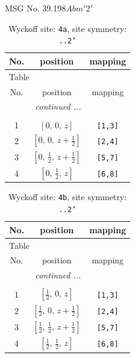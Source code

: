\documentclass[fleqn,8pt]{jsarticle}
\begin{document}
\setcounter{MaxMatrixCols}{32}

\renewcommand{\tablename}{Table~}
\renewcommand{\figurename}{Figure~}
\begin{center}
\LARGE
MSG No. 39.198\quad$Abm'2'$
\end{center}
\renewcommand{\arraystretch}{1.2}
\begin{longtable}{ccc}
\caption{Wyckoff site: {\tt 4a}, site symmetry: {\tt ..2'}}
 \\
 \hline \hline
No. & position & mapping \\ \hline \endfirsthead

\multicolumn{2}{l}{\tablename\ \thetable{}} \\
 \hline \hline
No. & position & mapping \\ \hline \endhead

 \hline \hline
\multicolumn{2}{r}{\footnotesize\it continued ...} \\ \endfoot

 \hline \hline
\multicolumn{2}{r}{} \\ \endlastfoot

1 & $\left[ 0,\, 0,\, z \right]$ & {\tt [1,3]} \\ \hline
2 & $\left[ 0,\, 0,\, z + \frac{1}{2} \right]$ & {\tt [2,4]} \\ \hline
3 & $\left[ 0,\, \frac{1}{2},\, z + \frac{1}{2} \right]$ & {\tt [5,7]} \\ \hline
4 & $\left[ 0,\, \frac{1}{2},\, z \right]$ & {\tt [6,8]} \\
\end{longtable}
\renewcommand{\arraystretch}{1.2}
\begin{longtable}{ccc}
\caption{Wyckoff site: {\tt 4b}, site symmetry: {\tt ..2'}}
 \\
 \hline \hline
No. & position & mapping \\ \hline \endfirsthead

\multicolumn{2}{l}{\tablename\ \thetable{}} \\
 \hline \hline
No. & position & mapping \\ \hline \endhead

 \hline \hline
\multicolumn{2}{r}{\footnotesize\it continued ...} \\ \endfoot

 \hline \hline
\multicolumn{2}{r}{} \\ \endlastfoot

1 & $\left[ \frac{1}{2},\, 0,\, z \right]$ & {\tt [1,3]} \\ \hline
2 & $\left[ \frac{1}{2},\, 0,\, z + \frac{1}{2} \right]$ & {\tt [2,4]} \\ \hline
3 & $\left[ \frac{1}{2},\, \frac{1}{2},\, z + \frac{1}{2} \right]$ & {\tt [5,7]} \\ \hline
4 & $\left[ \frac{1}{2},\, \frac{1}{2},\, z \right]$ & {\tt [6,8]} \\
\end{longtable}
\end{document}

